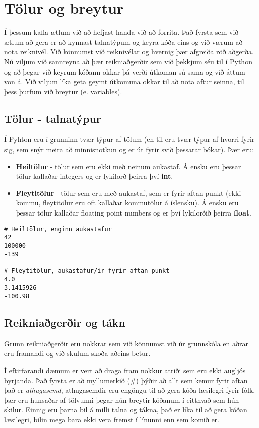 \documentclass[11pt,fleqn]{book} %
\begin{document}
\chapter{Tölur og breytur}
Í þessum kafla ætlum við að hefjast handa við að forrita. 
Það fyrsta sem við ætlum að gera er að kynnast talnatýpum og keyra kóða eins og við værum að nota reiknivél. 
Við könnumst við reiknivélar og hvernig þær afgreiða röð aðgerða. 
Nú viljum við sannreyna að þær reikniaðgerðir sem við þekkjum séu til í Python og að þegar við keyrum kóðann okkar þá verði útkoman sú sama og við áttum von á. 
Við viljum líka geta geymt útkomuna okkar til að nota aftur seinna, til þess þurfum við breytur (e. variables).

\section{Tölur - talnatýpur}
Í Pyhton eru í grunninn tvær týpur af tölum (en til eru tvær týpur af hvorri fyrir sig, sem snýr meira að minnisnotkun og er út fyrir svið þessarar bókar). 
Þær eru:

\begin{itemize}
	\item \textbf{Heiltölur} - tölur sem eru ekki með neinum aukastaf. 
	Á ensku eru þessar tölur kallaðar integers og er lykilorð þeirra því \textbf{int}.
	\item \textbf{Fleytitölur} - tölur sem eru með aukastaf, sem er fyrir aftan punkt (ekki kommu, fleytitölur eru oft kallaðar kommutölur á íslensku). 
	Á ensku eru þessar tölur kallaðar floating point numbers og er því lykilorðið þeirra \textbf{float}.
\end{itemize}

\begin{lstlisting}[caption=Heiltölur og fleytitölur]
# Heiltölur, enginn aukastafur
42
100000
-139

# Fleytitölur, aukastafur/ir fyrir aftan punkt
4.0
3.1415926
-100.98
\end{lstlisting}

\section{Reikniaðgerðir og tákn}
Grunn reikniaðgerðir eru nokkrar sem við könnumst við úr grunnskóla en aðrar eru framandi og við skulum skoða aðeins betur.

Í eftirfarandi dæmum er vert að draga fram nokkur atriði sem eru ekki augljós byrjanda. 
Það fyrsta er að myllumerkið (\#) þýðir að allt sem kemur fyrir aftan það er \textit{athugasemd}, athugasemdir eru engöngu til að gera kóða læsilegri fyrir fólk, þær eru hunsaðar af tölvunni þegar hún breytir kóðanum í eitthvað sem hún skilur. 
Einnig eru þarna bil á milli talna og tákna, það er líka til að gera kóðan læsilegri, bilin mega bara ekki vera fremst í línunni enn sem komið er.
\end{document}
